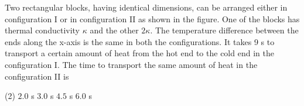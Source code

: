 
\item Two rectangular blocks, having identical dimensions, can be arranged either in configuration I or in configuration II as shown in the figure. One of the blocks has thermal conductivity \( \kappa \) and the other \( 2\kappa \). The temperature difference between the ends along the x-axis is the same in both the configurations. It takes 9 s to transport a certain amount of heat from the hot end to the cold end in the configuration I. The time to transport the same amount of heat in the configuration II is
\begin{center}
\end{center}
\begin{tasks}(2)
    \task \( 2.0 \) s
    \task \( 3.0 \) s
    \task \( 4.5 \) s
    \task \( 6.0 \) s
\end{tasks}
